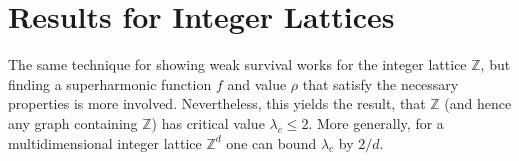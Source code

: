 \documentclass[a4paper,11pt]{amsart}
\theoremstyle{theorem}
\theoremstyle{definition}
\newcommand{\Z}{\mathbb{Z}}
\begin{document}
\section{Results for Integer Lattices}

The same technique for showing weak survival works for the integer lattice $\Z$, but finding a superharmonic function $f$ and value $\rho$ that satisfy the necessary properties is more involved. Nevertheless, this yields the result, that $\Z$ (and hence any graph containing $\Z$) has critical value $\lambda_c\leq 2$.
More generally, for a multidimensional integer lattice $\Z^d$ one can bound $\lambda_c$ by $2/d$.
\end{document}
